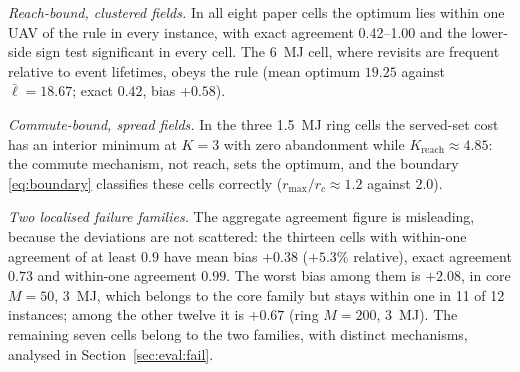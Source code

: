 \documentclass[journal,outdir=./]{IEEEtran}
\newcommand{\Kr}{K_{\mathrm{reach}}}
\newcommand{\rmax}{r_{\max}}
\newcommand{\rc}{r_{c}}
\begin{document}
\textit{Reach-bound, clustered fields.} In all eight paper cells the optimum lies within one UAV of the rule in every instance, with exact agreement 0.42--1.00 and the lower-side sign test significant in every cell. The 6~MJ cell, where revisits are frequent relative to event lifetimes, obeys the rule (mean optimum $19.25$ against $\bar\ell=18.67$; exact $0.42$, bias $+0.58$).

\textit{Commute-bound, spread fields.} In the three 1.5~MJ ring cells the served-set cost has an interior minimum at $K=3$ with zero abandonment while $\Kr\approx4.85$: the commute mechanism, not reach, sets the optimum, and the boundary \eqref{eq:boundary} classifies these cells correctly ($\rmax/\rc\approx1.2$ against $2.0$).

\textit{Two localised failure families.} The aggregate agreement figure is misleading, because the deviations are not scattered: the thirteen cells with within-one agreement of at least $0.9$ have mean bias $+0.38$ ($+5.3\%$ relative), exact agreement $0.73$ and within-one agreement $0.99$. The worst bias among them is $+2.08$, in core $M=50$, 3~MJ, which belongs to the core family but stays within one in 11 of 12 instances; among the other twelve it is $+0.67$ (ring $M=200$, 3~MJ). The remaining seven cells belong to the two families, with distinct mechanisms, analysed in Section~\ref{sec:eval:fail}.
\end{document}
